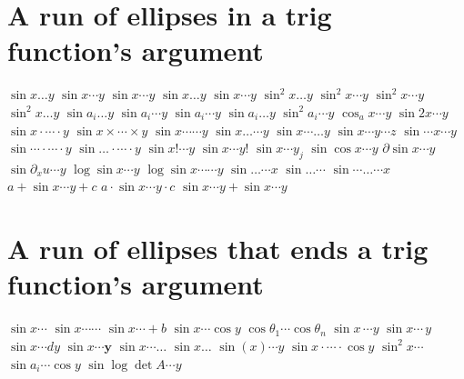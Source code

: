 \documentclass{article}
\begin{document}
\section{A run of ellipses in a trig function's argument}
$\sin x\ldots y$ $\sin x\cdots y$ $\sin x\dotsb y$ $\sin x\dots y$ $\sin x\dotsm y$ $\sin^2 x\ldots y$ $\sin^2 x\cdots y$
$\sin^2 x\dotsb y$ $\sin^2 x\dots y$ $\sin a_i\ldots y$ $\sin a_i\cdots y$ $\sin a_i\dotsb y$ $\sin a_i\dots y$
$\sin^2 a_i\cdots y$ $\cos_a x\cdots y$ $\sin 2x\cdots y$ $\sin x\cdot\cdots\cdot y$ $\sin x\times\cdots\times y$
$\sin x\cdots\cdots y$ $\sin x\ldots\cdots y$ $\sin x\cdots\ldots y$ $\sin x\cdots y\cdots z$ $\sin\cdots x\cdots y$
$\sin\cdots\cdot\cdots\cdot y$ $\sin\ldots\cdot\cdots\cdot y$ $\sin x!\cdots y$ $\sin x\cdots y!$ $\sin x\cdots y_j$
$\sin\cos x\cdots y$ $\partial\sin x\cdots y$ $\sin\partial_x u\cdots y$ $\log\sin x\cdots y$ $\log\sin x\cdots\cdots y$
$\sin\ldots\cdots x$ $\sin\ldots\cdots$ $\sin\cdots\ldots\cdots x$
$a+\sin x\cdots y+c$ $a\cdot\sin x\cdots y\cdot c$ $\sin x\cdots y+\sin x\cdots y$

\section{A run of ellipses that ends a trig function's argument}
$\sin x\cdots$ $\sin x\cdots\cdots$ $\sin x\cdots+b$ $\sin x\cdots\cos y$ $\cos\theta_1\cdots\cos\theta_n$ $\sin x\,\cdots y$
$\sin x\cdots\,y$ $\sin x\cdots dy$ $\sin x\cdots\mathbf{y}$ $\sin x\cdots\ldots$ $\sin x\ldots$ $\sin(x)\cdots y$
$\sin x\cdot\cdots\cdot\cos y$ $\sin^2 x\cdots$ $\sin a_i\cdots\cos y$ $\sin\log\det A\cdots y$

\end{document}
